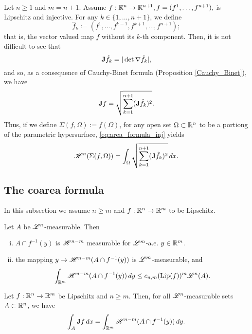 \begin{example}
Let $n \ge 1$ and $m = n + 1$. Assume $f : \mathbb{R}^{n} \to \mathbb{R}^{n + 1}, f = (f^1, \dots, f^{n + 1}),$ is Lipschitz and injective. For any $k \in \{1, \dots, n + 1 \}$, we define $$\hat{f}_{k} := (f^{1}, \dots, f^{k - 1}, f^{k + 1}, \dots, f^{n + 1});$$
that is, the vector valued map $f$ without its $k$-th component. Then, it is not difficult to see that $${\bf J} \hat{f}_{k} = |\det{\nabla \hat{f}_{k}}|,$$
and so, as a consequence of Cauchy-Binet formula (Proposition \ref{Cauchy_Binet}), we have
\begin{equation*}
{\bf J} f = \sqrt{\sum_{k = 1}^{n + 1} ({\bf J} \hat{f}_{k})^{2}}.
\end{equation*}
Thus, if we define $\Sigma(f, \Omega) := f(\Omega)$, for any open set $\Omega \subset \mathbb{R}^{n}$ to be a portiong of the parametric hypersurface, \eqref{eq:area_formula_inj} yields
\begin{equation*}
\mathscr{H}^{n}(\Sigma(f, \Omega)) = \int_{\Omega} \sqrt{\sum_{k = 1}^{n + 1} ({\bf J} \hat{f}_{k})^{2}} \, dx.
\end{equation*}
\end{example}

\subsection{The coarea formula}

In this subsection we assume $n \ge m$ and $f : \mathbb{R}^{n} \to \mathbb{R}^{m}$ to be Lipschitz.

\begin{lemma} Let $A$ be $\mathscr{L}^{n}$-measurable. Then
\begin{enumerate}[i)]
\item $A \cap f^{-1}(y)$ is $\mathscr{H}^{n - m}$ measurable for $\mathscr{L}^{m}$-a.e. $y \in \mathbb{R}^{m}$.
\item the mapping $y \to \mathscr{H}^{n - m}(A \cap f^{-1}(y))$ is $\mathscr{L}^{m}$-measurable, and
\begin{equation*}
\int_{\mathbb{R}^{m}} \mathscr{H}^{n - m}(A \cap f^{-1}(y)) \, d y \le c_{n, m} (\operatorname{Lip}(f))^{m} \mathscr{L}^{n}(A).
\end{equation*}
\end{enumerate}
\end{lemma}

\begin{theorem} \label{coarea_formula}
Let $f : \mathbb{R}^{n} \to \mathbb{R}^{m}$ be Lipschitz and $n \ge m$. Then, for all $\mathscr{L}^{n}$-measurable sets $A \subset \mathbb{R}^{n}$, we have
\begin{equation} \label{eq:coarea_formula}
\int_A {\bf J} f \, dx = \int_{\mathbb{R}^{m}} \mathscr{H}^{n - m}(A \cap f^{-1}(y)) \, dy.
\end{equation}
\end{theorem}

